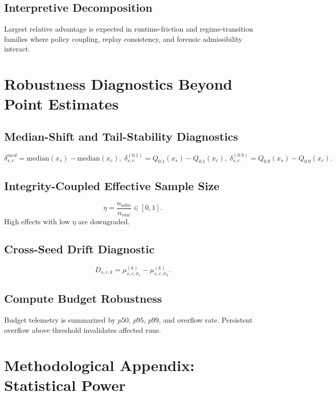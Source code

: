 \documentclass[11pt,a4paper]{article}
\theoremstyle{definition}
\begin{document}
\subsection{Interpretive Decomposition}
Largest relative advantage is expected in runtime-friction and regime-transition families where policy coupling, replay consistency, and forensic admissibility interact.

\section{Robustness Diagnostics Beyond Point Estimates}
\subsection{Median-Shift and Tail-Stability Diagnostics}
\[
\delta^{med}_{s,c}=\mathrm{median}(x_s)-\mathrm{median}(x_c),\;
\delta^{(0.1)}_{s,c}=Q_{0.1}(x_s)-Q_{0.1}(x_c),\;
\delta^{(0.9)}_{s,c}=Q_{0.9}(x_s)-Q_{0.9}(x_c).
\]

\subsection{Integrity-Coupled Effective Sample Size}
\[
\eta=\frac{n_{adm}}{n_{raw}}\in[0,1].
\]
High effects with low $\eta$ are downgraded.

\subsection{Cross-Seed Drift Diagnostic}
\[
D_{s,c,k}=\mu^{(k)}_{s,c,\sigma_1}-\mu^{(k)}_{s,c,\sigma_2}.
\]

\subsection{Compute Budget Robustness}
Budget telemetry is summarized by $p50$, $p95$, $p99$, and overflow rate. Persistent overflow above threshold invalidates affected runs.

\section{Methodological Appendix: Statistical Power}
\end{document}
